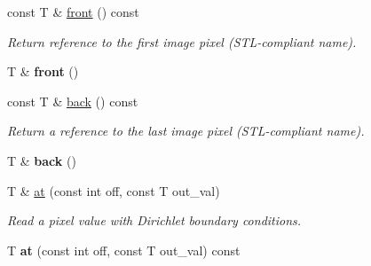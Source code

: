 \begin{DoxyCompactItemize}
\item 
\hypertarget{structcimg__library_1_1CImg_a33144bdb055f125014515b05fffaea8e}{
const T \& \hyperlink{structcimg__library_1_1CImg_a33144bdb055f125014515b05fffaea8e}{front} () const }
\label{structcimg__library_1_1CImg_a33144bdb055f125014515b05fffaea8e}

\begin{DoxyCompactList}\small\item\em Return reference to the first image pixel (STL-\/compliant name). \item\end{DoxyCompactList}\item 
\hypertarget{structcimg__library_1_1CImg_a55d9a449187445866021859f0cf708d0}{
T \& {\bfseries front} ()}
\label{structcimg__library_1_1CImg_a55d9a449187445866021859f0cf708d0}

\item 
\hypertarget{structcimg__library_1_1CImg_a66ff8d365d8820194730f759978dc1d0}{
const T \& \hyperlink{structcimg__library_1_1CImg_a66ff8d365d8820194730f759978dc1d0}{back} () const }
\label{structcimg__library_1_1CImg_a66ff8d365d8820194730f759978dc1d0}

\begin{DoxyCompactList}\small\item\em Return a reference to the last image pixel (STL-\/compliant name). \item\end{DoxyCompactList}\item 
\hypertarget{structcimg__library_1_1CImg_a94c484819f66b605343298653d4b1d07}{
T \& {\bfseries back} ()}
\label{structcimg__library_1_1CImg_a94c484819f66b605343298653d4b1d07}

\item 
\hypertarget{structcimg__library_1_1CImg_a0e62c450ce69d12159278e628ec8b874}{
T \& \hyperlink{structcimg__library_1_1CImg_a0e62c450ce69d12159278e628ec8b874}{at} (const int off, const T out\_\-val)}
\label{structcimg__library_1_1CImg_a0e62c450ce69d12159278e628ec8b874}

\begin{DoxyCompactList}\small\item\em Read a pixel value with Dirichlet boundary conditions. \item\end{DoxyCompactList}\item 
\hypertarget{structcimg__library_1_1CImg_a16a32b4dc6a873a75ba4c7d6ea17b602}{
T {\bfseries at} (const int off, const T out\_\-val) const }
\label{structcimg__library_1_1CImg_a16a32b4dc6a873a75ba4c7d6ea17b602}


\end{DoxyCompactItemize}
